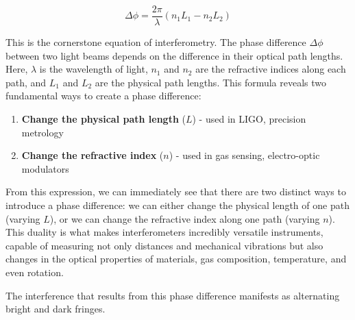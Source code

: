 \documentclass[
  a4paper,
]{book}
\providecommand{\tightlist}{%
  \setlength{\itemsep}{0pt}\setlength{\parskip}{0pt}}
\begin{document}
\begin{tcolorbox}[enhanced jigsaw, breakable, toptitle=1mm, bottomrule=.15mm, colbacktitle=quarto-callout-important-color!10!white, title=\textcolor{quarto-callout-important-color}{\faExclamation}\hspace{0.5em}{Fundamental Phase Difference Formula}, arc=.35mm, rightrule=.15mm, bottomtitle=1mm, opacityback=0, toprule=.15mm, coltitle=black, leftrule=.75mm, opacitybacktitle=0.6, colback=white, left=2mm, titlerule=0mm, colframe=quarto-callout-important-color-frame]

\[\Delta \phi = \frac{2\pi}{\lambda}(n_1 L_1 - n_2 L_2)\]

This is the cornerstone equation of interferometry. The phase difference
\(\Delta \phi\) between two light beams depends on the difference in
their optical path lengths. Here, \(\lambda\) is the wavelength of
light, \(n_1\) and \(n_2\) are the refractive indices along each path,
and \(L_1\) and \(L_2\) are the physical path lengths. This formula
reveals two fundamental ways to create a phase difference:

\begin{enumerate}
\def\labelenumi{\arabic{enumi}.}
\tightlist
\item
  \textbf{Change the physical path length} (\(L\)) - used in LIGO,
  precision metrology
\item
  \textbf{Change the refractive index} (\(n\)) - used in gas sensing,
  electro-optic modulators
\end{enumerate}

\end{tcolorbox}

From this expression, we can immediately see that there are two distinct
ways to introduce a phase difference: we can either change the physical
length of one path (varying \(L\)), or we can change the refractive
index along one path (varying \(n\)). This duality is what makes
interferometers incredibly versatile instruments, capable of measuring
not only distances and mechanical vibrations but also changes in the
optical properties of materials, gas composition, temperature, and even
rotation.

The interference that results from this phase difference manifests as
alternating bright and dark fringes.
\end{document}
